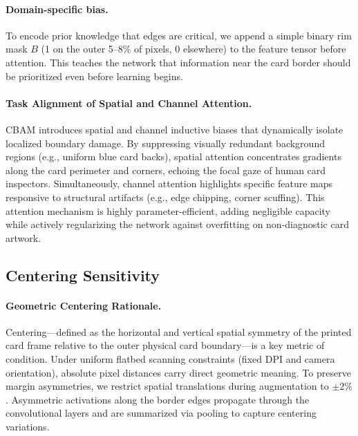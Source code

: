 \documentclass[12pt]{article}
\begin{document}
\paragraph{Domain-specific bias.}
To encode prior knowledge that edges are critical, we append a simple binary rim mask $B$ (1 on the outer 5--8\% of pixels, 0 elsewhere) to the feature tensor before attention. 
This teaches the network that information near the card border should be prioritized even before learning begins.

\paragraph{Task Alignment of Spatial and Channel Attention.}
CBAM introduces spatial and channel inductive biases that dynamically isolate localized boundary damage. 
By suppressing visually redundant background regions (e.g., uniform blue card backs), spatial attention concentrates gradients along the card perimeter and corners, echoing the focal gaze of human card inspectors.
Simultaneously, channel attention highlights specific feature maps responsive to structural artifacts (e.g., edge chipping, corner scuffing). 
This attention mechanism is highly parameter-efficient, adding negligible capacity while actively regularizing the network against overfitting on non-diagnostic card artwork.


\subsection{Centering Sensitivity}
\label{subsec:center}

\paragraph{Geometric Centering Rationale.}
Centering—defined as the horizontal and vertical spatial symmetry of the printed card frame relative to the outer physical card boundary—is a key metric of condition. 
Under uniform flatbed scanning constraints (fixed DPI and camera orientation), absolute pixel distances carry direct geometric meaning. 
To preserve margin asymmetries, we restrict spatial translations during augmentation to $\pm 2\%$. 
Asymmetric activations along the border edges propagate through the convolutional layers and are summarized via pooling to capture centering variations.
\end{document}
